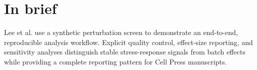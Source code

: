 \section{In brief}
Lee et al. use a synthetic perturbation screen to demonstrate an end-to-end,
reproducible analysis workflow. Explicit quality control, effect-size reporting,
and sensitivity analyses distinguish stable stress-response signals from batch
effects while providing a complete reporting pattern for Cell Press manuscripts.
